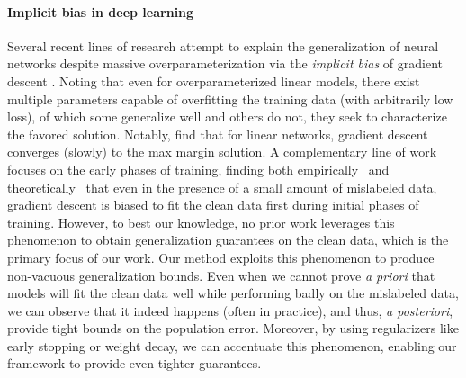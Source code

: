 

\paragraph{Implicit bias in deep learning} 
Several recent lines of research 
attempt to explain the generalization of neural networks 
despite massive overparameterization
via the \emph{implicit bias} of gradient descent
\citep{soudry2018implicit,gunasekar2018implicitb,gunasekar2018implicita,ji2019implicit,chizat2020implicit}. 
Noting that even for overparameterized linear models,
there exist multiple parameters 
capable of overfitting the training data
(with arbitrarily low loss), 
of which some generalize well
and others do not,
they seek to characterize the favored solution.
Notably, \citet{soudry2018implicit}
find that for linear networks,
gradient descent converges (slowly)
to the max margin solution.
% 
A complementary line of work
focuses on the early phases of training,
finding both empirically~\citep{rolnick2017deep,arpit2017closer} 
and theoretically~\citep{arora2019fine,li2020gradient,liu2020early}
that even in the presence 
of a small amount of mislabeled data, 
gradient descent is biased 
to fit the clean data first
during initial phases of training. 
However, to best our knowledge,
no prior work leverages this phenomenon 
to obtain generalization guarantees on the clean data,
which is the primary focus of our work. 
% 
Our method exploits this phenomenon 
to produce non-vacuous generalization bounds.
Even when we cannot prove \emph{a priori}
that models will fit the clean data well
while performing badly on the mislabeled data,
we can observe that it indeed happens (often in practice),
and thus, \emph{a posteriori}, 
provide tight bounds on the population error.
Moreover, by using regularizers
like early stopping or weight decay, 
we can accentuate this phenomenon,
enabling our framework to
provide even tighter guarantees.


